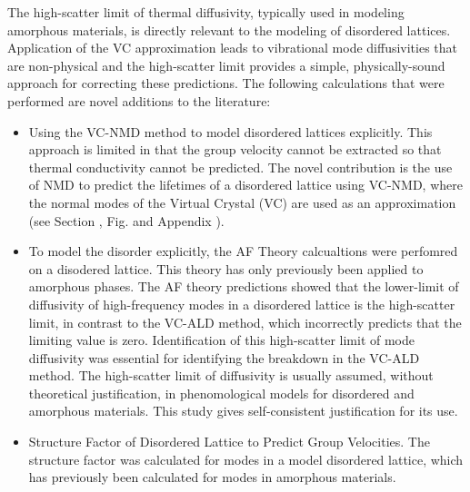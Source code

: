 The high-scatter limit of thermal diffusivity,  
typically used in modeling amorphous materials, is directly relevant 
to the modeling of disordered lattices. 
Application of the VC 
approximation leads to vibrational mode diffusivities that are 
non-physical and the high-scatter limit provides a simple, 
physically-sound approach for correcting these predictions. 
The following calculations that were performed are novel additions 
to the literature:
\begin{itemize}
\item Using the VC-NMD method to model disordered 
lattices explicitly. This approach is limited in 
that the group velocity cannot be extracted so that thermal conductivity 
cannot be predicted.  The novel contribution is the use of 
NMD to predict the lifetimes of a disordered lattice using VC-NMD, 
where the normal modes of the Virtual Crystal (VC) are used as an 
approximation (see Section , Fig. and Appendix ).
\item  To model the disorder 
explicitly, the AF Theory calcualtions were perfomred 
on a disodered lattice. This theory has only previously been applied 
to amorphous phases.
\cite{feldman_thermal_1993,feldman_numerical_1999,
shenogin_,he_heat_2011}
The AF theory predictions showed that the lower-limit 
of diffusivity of high-frequency modes in a disordered lattice is the 
high-scatter limit, in contrast to the VC-ALD method, which incorrectly 
predicts that the limiting value is zero. Identification of this 
high-scatter limit of mode diffusivity was essential for identifying 
the breakdown in the VC-ALD method.  The high-scatter limit of 
diffusivity is usually assumed, without theoretical justification, in 
phenomological models for disordered and amorphous materials.
\cite{kittel_interpretation_1949,graebner_phonon_1986,
cahill_lattice_1988} 
This study gives self-consistent justification for its use.
\item Structure Factor of Disordered Lattice to Predict Group Velocities. 
The structure factor was calculated for modes in a model disordered 
lattice, which has previously been calculated for modes in amorphous 
materials.
\cite{biswas_vibrational_1988,feldman_thermal_1993,
allen_diffusons_1999,feldman_numerical_1999,
taraskin_determination_1999,taraskin_propagation_2000,
volz_molecular-dynamics_2000,
gotze_evolution_2000,horbach_high_2001,
martin-mayor_dynamical_2001,feldman_calculations_2002,
ciliberti_brillouin_2003,christie_vibrational_2007,
shintani_universal_2008,wyart_scaling_2010,
beltukov_ioffe-regel_2013,larkin_predicting_2013,
}
\end{itemize}
